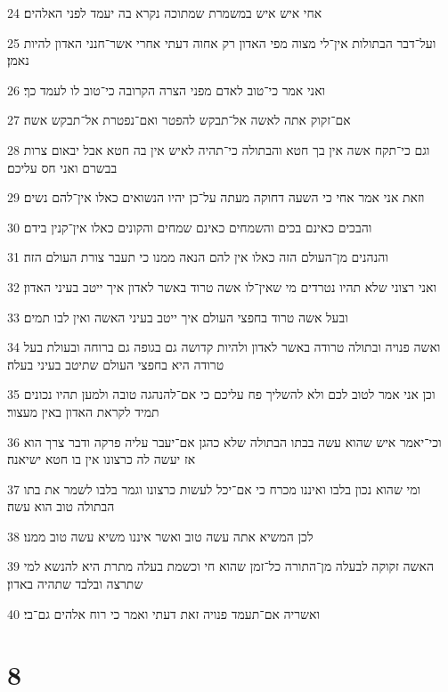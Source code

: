 \par 24 אחי איש איש במשמרת שמתוכה נקרא בה יעמד לפני האלהים׃
\par 25 ועל־דבר הבתולות אין־לי מצוה מפי האדון רק אחוה דעתי אחרי אשר־חנני האדון להיות נאמן׃
\par 26 ואני אמר כי־טוב לאדם מפני הצרה הקרובה כי־טוב לו לעמד כך׃
\par 27 אם־זקוק אתה לאשה אל־תבקש להפטר ואם־נפטרת אל־תבקש אשה׃
\par 28 וגם כי־תקח אשה אין בך חטא והבתולה כי־תהיה לאיש אין בה חטא אבל יבאום צרות בבשרם ואני חס עליכם׃
\par 29 וזאת אני אמר אחי כי השעה דחוקה מעתה על־כן יהיו הנשואים כאלו אין־להם נשים׃
\par 30 והבכים כאינם בכים והשמחים כאינם שמחים והקונים כאלו אין־קנין בידם׃
\par 31 והנהנים מן־העולם הזה כאלו אין להם הנאה ממנו כי תעבר צורת העולם הזה׃
\par 32 ואני רצוני שלא תהיו נטרדים מי שאין־לו אשה טרוד באשר לאדון איך ייטב בעיני האדון׃
\par 33 ובעל אשה טרוד בחפצי העולם איך ייטב בעיני האשה ואין לבו תמים׃
\par 34 ואשה פנויה ובתולה טרודה באשר לאדון ולהיות קדושה גם בגופה גם ברוחה ובעולת בעל טרודה היא בחפצי העולם שתיטב בעיני בעלה׃
\par 35 וכן אני אמר לטוב לכם ולא להשליך פח עליכם כי אם־להנהגה טובה ולמען תהיו נכונים תמיד לקראת האדון באין מעצור׃
\par 36 וכי־יאמר איש שהוא עשה בבתו הבתולה שלא כהגן אם־יעבר עליה פרקה ודבר צרך הוא אז יעשה לה כרצונו אין בו חטא ישיאנה׃
\par 37 ומי שהוא נכון בלבו ואיננו מכרח כי אם־יכל לעשות כרצונו וגמר בלבו לשמר את בתו הבתולה טוב הוא עשה׃
\par 38 לכן המשיא אתה עשה טוב ואשר איננו משיא עשה טוב ממנו׃
\par 39 האשה זקוקה לבעלה מן־התורה כל־זמן שהוא חי וכשמת בעלה מתרת היא להנשא למי שתרצה ובלבד שתהיה באדון׃
\par 40 ואשריה אם־תעמד פנויה זאת דעתי ואמר כי רוח אלהים גם־בי׃

\chapter{8}

